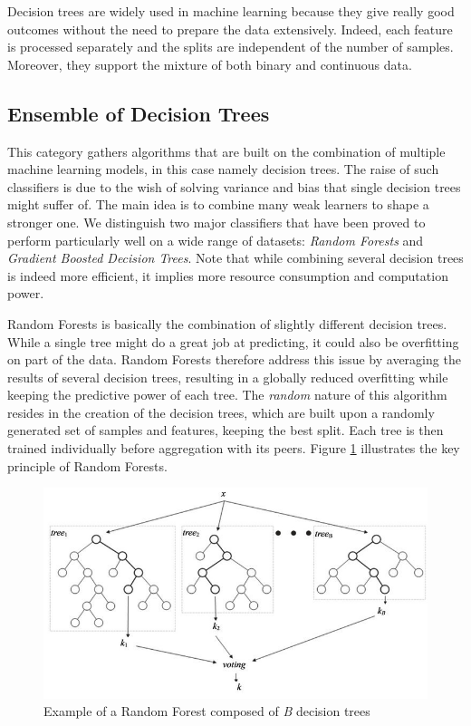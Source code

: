 Decision trees are widely used in machine learning because they give really good outcomes without the need to prepare the data extensively. Indeed, each feature is processed separately and the splits are independent of the number of samples. Moreover, they support the mixture of both binary and continuous data.

\subsection{Ensemble of Decision Trees}

This category gathers algorithms that are built on the combination of multiple machine learning models, in this case namely decision trees. The raise of such classifiers is due to the wish of solving variance and bias that single decision trees might suffer of. The main idea is to combine many weak learners to shape a stronger one. We distinguish two major classifiers that have been proved to perform particularly well on a wide range of datasets: \textit{Random Forests} and \textit{Gradient Boosted Decision Trees}. Note that while combining several decision trees is indeed more efficient, it implies more resource consumption and computation power.

Random Forests is basically the combination of slightly different decision trees. While a single tree might do a great job at predicting, it could also be overfitting on part of the data. Random Forests therefore address this issue by averaging the results of several decision trees, resulting in a globally reduced overfitting while keeping the predictive power of each tree. The \textit{random} nature of this algorithm resides in the creation of the decision trees, which are built upon a randomly generated set of samples and features, keeping the best split. Each tree is then trained individually before aggregation with its peers. Figure \ref{fig:RF} illustrates the key principle of Random Forests.

\begin{figure}[!ht]
  \includegraphics[width=\linewidth]{Figures/RF.png}
  \caption{Example of a Random Forest composed of \textit{B} decision trees \cite{edt_source}}
  \label{fig:RF}
\end{figure}

